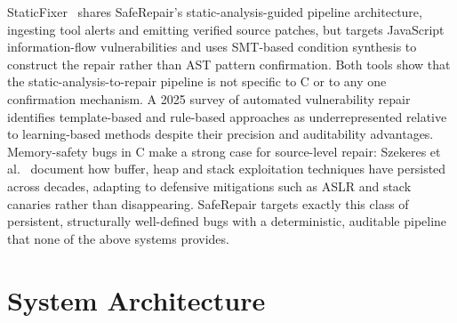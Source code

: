 \documentclass[conference]{IEEEtran}
\begin{document}
StaticFixer~\cite{b5} shares SafeRepair's static-analysis-guided pipeline
architecture, ingesting tool alerts and emitting verified source patches, but
targets JavaScript information-flow vulnerabilities and uses SMT-based condition
synthesis to construct the repair rather than AST pattern confirmation. Both tools
show that the static-analysis-to-repair pipeline is not specific to C or to any
one confirmation mechanism. A 2025 survey of automated vulnerability repair~\cite{b1}
identifies template-based and rule-based approaches as underrepresented relative
to learning-based methods despite their precision and auditability advantages.
Memory-safety bugs in C make a strong case for source-level repair: Szekeres
et al.~\cite{b9} document how buffer, heap and stack exploitation techniques have
persisted across decades, adapting to defensive mitigations such as ASLR and stack
canaries rather than disappearing. SafeRepair targets exactly this class of
persistent, structurally well-defined bugs with a deterministic, auditable pipeline
that none of the above systems provides.


\section{System Architecture}
\label{sec:arch}
\end{document}
